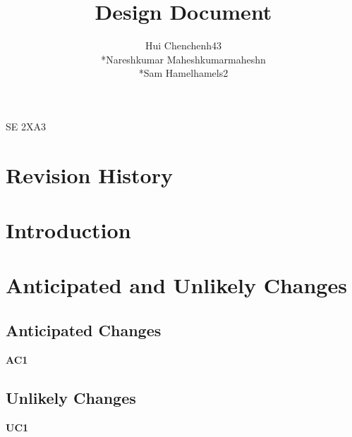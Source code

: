 \documentclass[11pt]{article}
\begin{document}
    \begin{titlepage}
    \title {Design Document}
    \maketitle
        \begin{center}
		SE 2XA3\\
		\author{
		Hui Chen\hspace{128pt}chenh43	
		\\*Nareshkumar Maheshkumar\hspace{35pt}maheshn 
		\\*Sam Hamel\hspace{118pt}hamels2 \\
		}
		\end{center}
    \end{titlepage}
    
    \newpage
    
    \tableofcontents
    \listoffigures
    \listoftables
    
    \newpage
    \section{Revision History}
    \section{Introduction}
    \section{Anticipated and Unlikely Changes}
    \subsection{Anticipated Changes}
    \textbf{AC1}
     
    \subsection{Unlikely Changes}
    \textbf{UC1}
    
\end{document}
